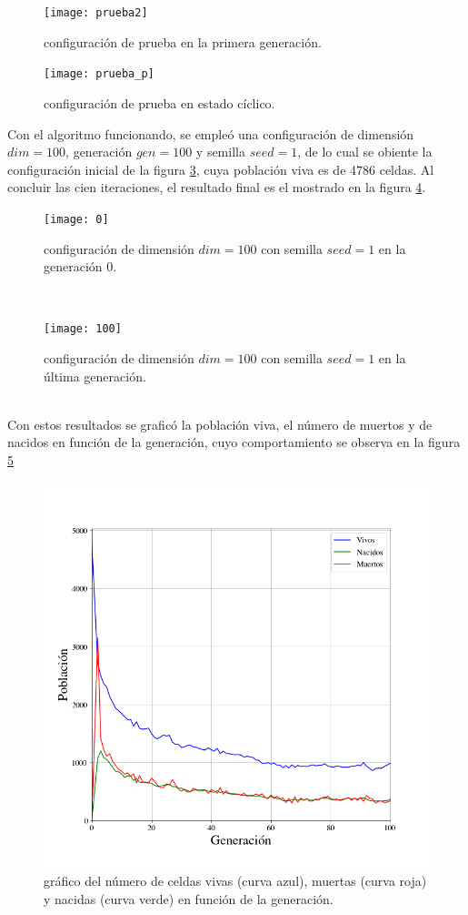 \documentclass[11pt]{diazessay} %
\begin{document}
%
\begin{figure}[h!]
\centering
\texttt{[image: prueba2]}
\caption{configuración de prueba en la primera generación.} \label{fig:gen1}
\end{figure}
%
\begin{figure}[h!]
\centering
\texttt{[image: prueba\_p]}
\caption{configuración de prueba en estado cíclico.} \label{fig:gen_c}
\end{figure}
%
\newpage
%
Con el algoritmo funcionando, se empleó una configuración de dimensión $dim = 100$, generación $gen = 100$ y semilla $seed = 1$, de lo cual se obiente la configuración inicial de la figura \ref{fig:gen_0}, cuya población viva es de 4786 celdas. Al concluir las cien iteraciones, el resultado final es el mostrado en la figura \ref{fig:fin}.
%
\begin{figure}[h!]
\centering
\texttt{[image: 0]}
\caption{configuración de dimensión $dim = 100$ con semilla $seed = 1$ en la generación 0.} \label{fig:gen_0}
\end{figure}
\\ 
%
\begin{figure}[h!]
\centering
\texttt{[image: 100]}
\caption{configuración de dimensión $dim = 100$ con semilla $seed = 1$ en la última generación.} \label{fig:fin}
\end{figure}
\\ 
Con estos resultados se graficó la población viva, el número de muertos y de nacidos en función de la generación, cuyo comportamiento se observa en la figura \ref{fig:graf}
%
\begin{figure}[h!]
\centering
\includegraphics[scale=0.5]{Figures/population}
\caption{gráfico del número de celdas vivas (curva azul), muertas (curva roja) y nacidas (curva verde) en función de la generación.}\label{fig:graf}
\end{figure}
\end{document}
